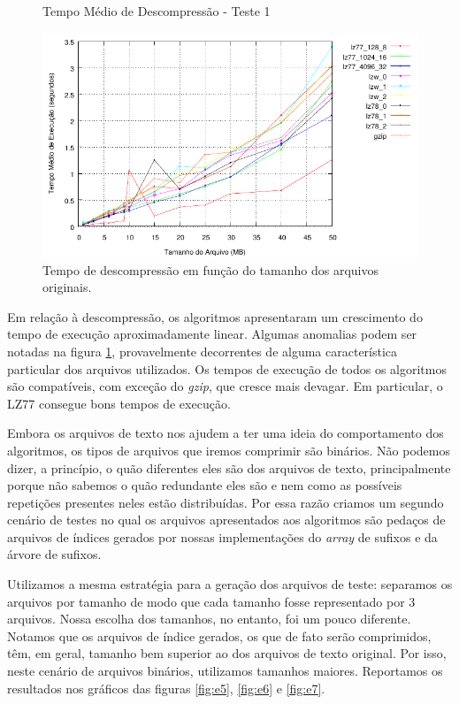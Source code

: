 \documentclass[]{article}
\newcommand{\figref}[1]{figura \ref{#1}}
\begin{document}
\begin{figure}
	{\centering Tempo Médio de Descompressão - Teste 1\par}
	\includegraphics{images/natural_descompressao}
\caption{Tempo de descompressão em função do tamanho dos arquivos originais.}
\label{fig:e4}
\end{figure}

Em relação à descompressão, os algoritmos apresentaram um crescimento do tempo de execução aproximadamente linear. Algumas anomalias podem ser notadas na \figref{fig:e4}, provavelmente decorrentes de alguma característica particular dos arquivos utilizados. Os tempos de execução de todos os algoritmos são compatíveis, com exceção do \textit{gzip}, que cresce mais devagar. Em particular, o LZ77 consegue bons tempos de execução.

Embora os arquivos de texto nos ajudem a ter uma ideia do comportamento dos algoritmos, os tipos de arquivos que iremos comprimir são binários. Não podemos dizer, a princípio, o quão diferentes eles são dos arquivos de texto, principalmente porque não sabemos o quão redundante eles são e nem como as possíveis repetições presentes neles estão distribuídas. Por essa razão criamos um segundo cenário de testes no qual os arquivos apresentados aos algoritmos são pedaços de arquivos de índices gerados por nossas implementações do \textit{array} de sufixos e da árvore de sufixos. 

Utilizamos a mesma estratégia para a geração dos arquivos de teste: separamos os arquivos por tamanho de modo que cada tamanho fosse representado por 3 arquivos. Nossa escolha dos tamanhos, no entanto, foi um pouco diferente. Notamos que os arquivos de índice gerados, os que de fato serão comprimidos, têm, em geral, tamanho bem superior ao dos arquivos de texto original. Por isso, neste cenário de arquivos binários, utilizamos tamanhos maiores. Reportamos os resultados nos gráficos das figuras \ref{fig:e5}, \ref{fig:e6} e \ref{fig:e7}.
\end{document}
